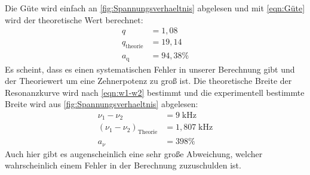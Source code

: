 \documentclass[titlepage = firstcover]{scrartcl}
\begin{document}
            Die Güte wird einfach an \ref{fig:Spannungsverhaeltnis} abgelesen und mit \eqref{eqn:Güte} wird der theoretische Wert berechnet:
            \begin{align}
                q &= 1,08 \\
                q_\text{theorie} &= 19,14 \\
                a_\text{q} &= 94,38 \%
            \end{align}
            Es scheint, dass es einen systematischen Fehler in unserer Berechnung gibt und der Theoriewert um eine Zehnerpotenz zu groß ist.
            Die theoretische Breite der Resonanzkurve wird nach \eqref{eqn:w1-w2} bestimmt und die experimentell bestimmte Breite wird aus
            \ref{fig:Spannungsverhaeltnis} abgelesen:
            \begin{align}
                \nu_1 - \nu_2 &= 9 \; \text{kHz} \\
                (\nu_1 - \nu_2)_\text{Theorie} &= 1,807 \; \text{kHz} \\
                a_{\nu} &= 398 \%                
            \end{align}
            Auch hier gibt es augenscheinlich eine sehr große Abweichung, welcher wahrscheinlich einem Fehler in der Berechnung zuzuschulden ist.
\end{document}
